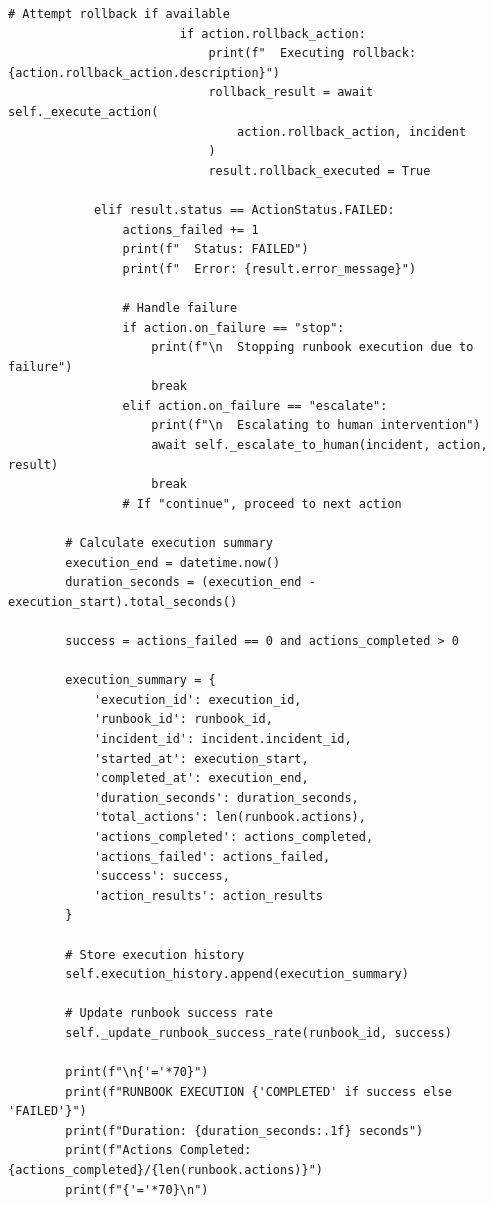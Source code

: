 \begin{lstlisting}[style=python, caption={Runbook automation with guided remediation}]
                        # Attempt rollback if available
                        if action.rollback_action:
                            print(f"  Executing rollback: {action.rollback_action.description}")
                            rollback_result = await self._execute_action(
                                action.rollback_action, incident
                            )
                            result.rollback_executed = True

            elif result.status == ActionStatus.FAILED:
                actions_failed += 1
                print(f"  Status: FAILED")
                print(f"  Error: {result.error_message}")

                # Handle failure
                if action.on_failure == "stop":
                    print(f"\n  Stopping runbook execution due to failure")
                    break
                elif action.on_failure == "escalate":
                    print(f"\n  Escalating to human intervention")
                    await self._escalate_to_human(incident, action, result)
                    break
                # If "continue", proceed to next action

        # Calculate execution summary
        execution_end = datetime.now()
        duration_seconds = (execution_end - execution_start).total_seconds()

        success = actions_failed == 0 and actions_completed > 0

        execution_summary = {
            'execution_id': execution_id,
            'runbook_id': runbook_id,
            'incident_id': incident.incident_id,
            'started_at': execution_start,
            'completed_at': execution_end,
            'duration_seconds': duration_seconds,
            'total_actions': len(runbook.actions),
            'actions_completed': actions_completed,
            'actions_failed': actions_failed,
            'success': success,
            'action_results': action_results
        }

        # Store execution history
        self.execution_history.append(execution_summary)

        # Update runbook success rate
        self._update_runbook_success_rate(runbook_id, success)

        print(f"\n{'='*70}")
        print(f"RUNBOOK EXECUTION {'COMPLETED' if success else 'FAILED'}")
        print(f"Duration: {duration_seconds:.1f} seconds")
        print(f"Actions Completed: {actions_completed}/{len(runbook.actions)}")
        print(f"{'='*70}\n")


\end{lstlisting}
